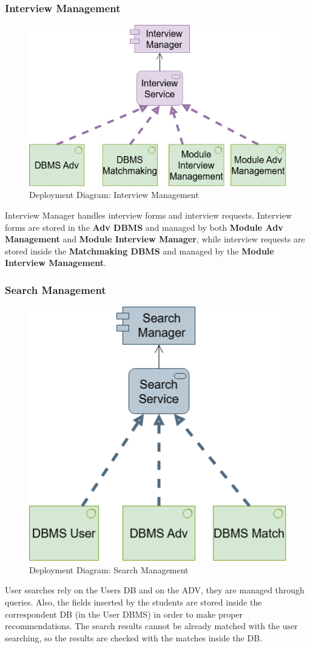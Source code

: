 \subsubsection{Interview Management}
\begin{figure}[H]
    \centering
    \includegraphics[width=0.45\linewidth]{images/architectural design/deployment/depl-inter.drawio.png}
    \caption{Deployment Diagram: Interview Management}
\end{figure}
Interview Manager handles interview forms and interview requests. Interview forms are stored in the \textbf{Adv DBMS} and managed by both \textbf{Module Adv Management} and \textbf{Module Interview Manager}, while interview requests are stored inside the \textbf{Matchmaking DBMS} and managed by the \textbf{Module Interview Management}.

\subsubsection{Search Management}
\begin{figure}[H]
    \centering
    \includegraphics[width=0.25\linewidth]{images/architectural design/deployment/depl-search.drawio (1).png}
    \caption{Deployment Diagram: Search Management}
\end{figure}
User searches rely on the Users DB and on the ADV, they are managed through queries. Also, the fields inserted by the students are stored inside the correspondent DB (in the User DBMS) in order to make proper recommendations. The search results cannot be already matched with the user searching, so the results are checked with the matches inside the DB.

